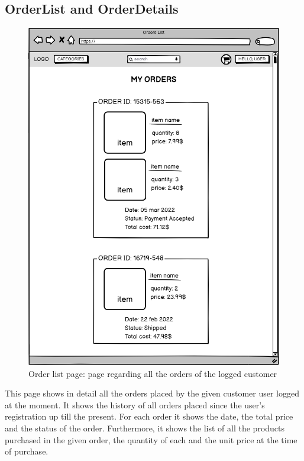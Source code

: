 \subsection{OrderList and OrderDetails}
    \begin{figure}[H]
        \centering
        \includegraphics[width=\textwidth,height=0.7\textheight,keepaspectratio]{mockups/ordersPageMockup.png}
            \caption{Order list page: page regarding all the orders of the logged customer}
            \label{fig:OrderPage}
    \end{figure}

This page shows in detail all the orders placed by the given customer user logged at the moment. It shows the history of all orders placed since the user's registration up till the present. For each order it shows the date, the total price and the status of the order.
Furthermore, it shows the list of all the products purchased in the given order, the quantity of each and the unit price at the time of purchase.

